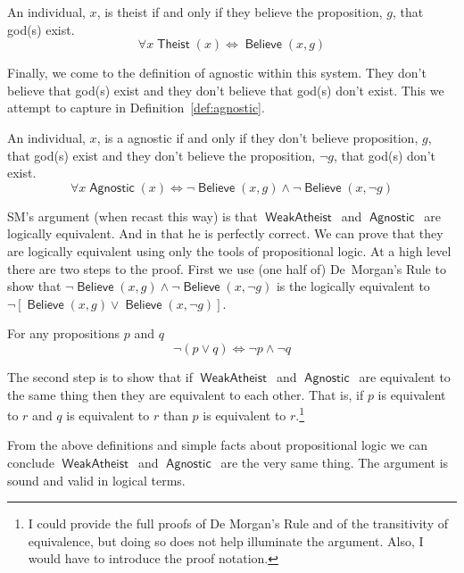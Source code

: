 \documentclass[12pt]{article}
\providecommand{\land}{\wedge}
\providecommand{\lor}{\vee}
\providecommand{\liff}{\iff}
\providecommand{\lnot}{\neg}
\providecommand{\lall}{\forall}
\newcommand{\rel}[1]{\ensuremath{\mathop{\mathsf{#1}}}}
\newcommand{\rlbelieve}{\rel{Believe}}
\newcommand{\rlwa}{\rel{WeakAtheist}}
\newcommand{\rlagno}{\rel{Agnostic}}
\begin{document}
\begin{definition}[Theist]\label{def:theist}
    An individual, $x$, is theist if and only if they believe the proposition, $g$, that god(s) exist.
    \[
        \lall x \rel{Theist}(x) \liff \rlbelieve(x, g)
    \]
\end{definition}

Finally, we come to the definition of agnostic within this system. They don't believe that god(s) exist and they don't believe that god(s) don't exist.
This we attempt to capture in Definition~\ref{def:agnostic}.

\begin{definition}[Agnostic]\label{def:agnostic}
    An individual, $x$, is a agnostic if and only if they don't believe proposition, $g$, that god(s) exist and they don't believe the proposition, $\lnot g$, that god(s) don't exist.
    \[
        \lall x \rlagno(x) \liff
          \lnot \rlbelieve(x, g) \land \lnot\rlbelieve(x, \lnot g)
    \]
\end{definition}

SM's argument (when recast this way) is that \rlwa\ and \rlagno\ are logically equivalent.
And in that he is perfectly correct. We can prove that they are logically equivalent using only the tools of propositional logic.
At a high level there are two steps to the proof. First we use (one half of) De~Morgan's Rule to show that $\lnot \rlbelieve(x, g) \land \lnot\rlbelieve(x, \lnot g)$ is the logically equivalent to $\lnot\left[\rlbelieve(x, g) \lor \rlbelieve(x, \lnot g)\right]$.

\begin{theorem}
    For any propositions $p$ and $q$ 
    \[
        \lnot\left(p \lor q\right) \liff \lnot p \land \lnot q
    \]  
\end{theorem}


The second step is to show that if \rlwa\ and \rlagno\ are equivalent to the same thing then they are equivalent to each other. That is, if $p$ is equivalent to $r$ and $q$ is equivalent to $r$ than $p$ is equivalent to $r$.\footnote{I could provide the full proofs of De Morgan's Rule and of the transitivity of equivalence, but doing so does not help illuminate the argument. Also, I would have to introduce the proof notation.}

From the above definitions and simple facts about propositional logic we can conclude \rlwa\ and \rlagno\ are the very same thing. The argument is sound and valid in logical terms.
\end{document}
